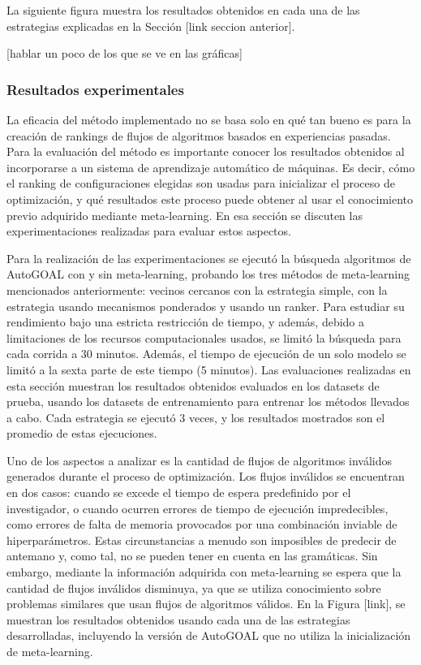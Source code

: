 La siguiente figura muestra los resultados obtenidos en cada una de las estrategias explicadas en la Sección [link seccion anterior].

[hablar un poco de los que se ve en las gráficas]

\subsubsection{Resultados experimentales}

%
%

La eficacia del método implementado no se basa solo en qué tan bueno es para la creación de rankings  de flujos de algoritmos basados en experiencias pasadas. Para la evaluación del método es importante conocer los resultados obtenidos al incorporarse a un sistema de aprendizaje automático de máquinas. Es decir, cómo el ranking de configuraciones elegidas son usadas para inicializar el proceso de optimización, y qué resultados este proceso puede obtener al usar el conocimiento previo adquirido mediante meta-learning. En esa sección se discuten las experimentaciones realizadas para evaluar estos aspectos.

Para la realización de las experimentaciones se ejecutó la búsqueda algoritmos de AutoGOAL con y sin meta-learning, probando los tres métodos de meta-learning mencionados anteriormente: vecinos cercanos con la estrategia simple, con la estrategia usando mecanismos ponderados y usando un ranker. Para estudiar su rendimiento bajo una estricta restricción de tiempo, y además, debido a limitaciones de los recursos computacionales usados, se limitó la búsqueda para cada corrida a 30 minutos. Además, el tiempo de ejecución de un solo modelo se limitó a la sexta parte de este tiempo (5 minutos). Las evaluaciones realizadas en esta sección muestran los resultados obtenidos evaluados en los datasets de prueba, usando los datasets de entrenamiento para entrenar los métodos llevados a cabo. Cada estrategia se ejecutó 3 veces, y los resultados mostrados son el promedio de estas ejecuciones. 

Uno de los aspectos a analizar es la cantidad de flujos de algoritmos inválidos generados durante el proceso de optimización. Los flujos inválidos se encuentran en dos casos: cuando se excede el tiempo de espera predefinido por el investigador, o cuando ocurren errores de tiempo de ejecución impredecibles, como errores de falta de memoria provocados por una combinación inviable de hiperparámetros. Estas circunstancias a menudo son imposibles de predecir de antemano y, como tal, no se pueden tener en cuenta en las gramáticas. Sin embargo, mediante la información adquirida con meta-learning se espera que la cantidad de flujos inválidos disminuya, ya que se utiliza conocimiento sobre problemas similares que usan flujos de algoritmos válidos. En la Figura [link], se muestran los resultados obtenidos usando cada una de las estrategias desarrolladas, incluyendo la versión de AutoGOAL que no utiliza la inicialización de meta-learning.

